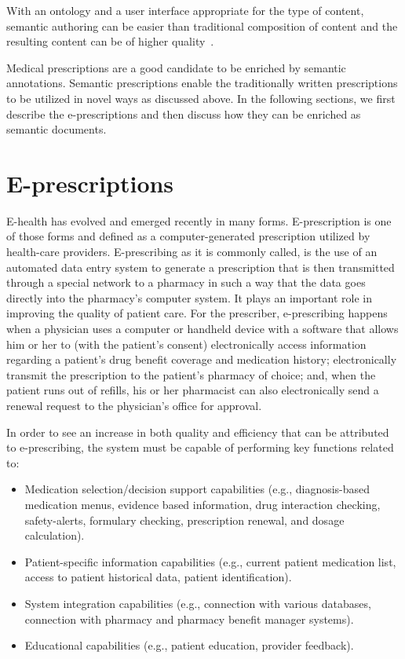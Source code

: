 \documentclass[conference]{IEEEtran}
\begin{document}
With an ontology and a user interface appropriate for the type of content, semantic authoring can be easier than traditional composition of content and the resulting content can be of higher quality~\cite{hasida2007}.

Medical prescriptions are a good candidate to be enriched by semantic annotations.
Semantic prescriptions enable the traditionally written prescriptions to be utilized in novel ways as discussed above.
In the following sections, we first describe the e-prescriptions and then discuss how they can be enriched as semantic documents.

\section{E-prescriptions}
\label{sec:epresc}

E-health has evolved and emerged recently in many forms.
E-prescription is one of those forms and defined as a computer-generated prescription utilized by health-care providers.
E-prescribing as it is commonly called, is the use of an automated data entry system to generate a prescription that is then transmitted through a special network to a pharmacy in such a way that the data goes directly into the pharmacy’s computer system.
It plays an important role in improving the quality of patient care.
For the prescriber, e-prescribing happens when a physician uses a computer or handheld device with a software that allows him or her to (with the patient’s consent) electronically access information regarding a patient’s drug benefit coverage and medication history; electronically transmit the prescription to the patient’s pharmacy of choice; and, when the patient runs out of refills, his or her pharmacist can also electronically send a renewal request to the physician’s office for approval.

In order to see an increase in both quality and efficiency that can be attributed to e-prescribing, the system must be capable of performing key functions related to:
\begin{itemize}
  \item Medication selection/decision support capabilities (e.g., diagnosis-based medication menus, evidence based information, drug interaction checking, safety-alerts, formulary checking, prescription renewal, and dosage calculation).
  \item Patient-specific information capabilities (e.g., current patient medication list, access to patient historical data, patient identification).
  \item System integration capabilities (e.g., connection with various databases, connection with pharmacy and pharmacy benefit manager systems).
  \item Educational capabilities (e.g., patient education, provider feedback).
\end{itemize}
\end{document}
